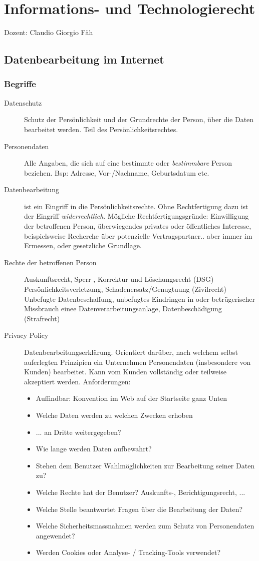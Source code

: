 \chapter{Informations- und Technologierecht}
Dozent: Claudio Giorgio Fäh

\section{Datenbearbeitung im Internet}
\subsection{Begriffe}
\begin{description}
  \item[Datenschutz] Schutz der Persönlichkeit und der Grundrechte der Person, über die Daten bearbeitet werden. Teil des Persönlichkeitsrechtes.
  \item[Personendaten] Alle Angaben, die sich auf eine bestimmte oder \textit{bestimmbare} Person beziehen. Bsp: Adresse, Vor-/Nachname, Geburtsdatum etc.  
  \item[Datenbearbeitung] ist ein Eingriff in die Persönlichkeitsrechte. Ohne Rechtfertigung dazu ist der Eingriff \textit{widerrechtlich}. Mögliche Rechtfertigungsgründe: Einwilligung der betroffenen Person, überwiegendes privates oder öffentliches Interesse, beispielsweise Recherche über potenzielle Vertragspartner.. aber immer im Ermessen, oder gesetzliche Grundlage.
  \item[Rechte der betroffenen Person] Auskunftsrecht, Sperr-, Korrektur und Löschungsrecht (DSG) Persönlichkeitsverletzung, Schadenersatz/Genugtuung (Zivilrecht) Unbefugte Datenbeschaffung, unbefugtes Eindringen in oder betrügerischer Missbrauch einee Datenverarbeitungsanlage, Datenbeschädigung (Strafrecht)
  \item[Privacy Policy] Datenbearbeitungserklärung. Orientiert darüber, nach welchem selbst auferlegten Prinzipien ein Unternehmen Personendaten (insbesondere von Kunden) bearbeitet. Kann vom Kunden vollständig oder teilweise akzeptiert werden. Anforderungen:
    \begin{itemize}
      \item Auffindbar: Konvention im Web auf der Startseite ganz Unten
      \item Welche Daten werden zu welchen Zwecken erhoben
      \item ... an Dritte weitergegeben?
      \item Wie lange werden Daten aufbewahrt?
      \item Stehen dem Benutzer Wahlmöglichkeiten zur Bearbeitung seiner Daten zu?
      \item Welche Rechte hat der Benutzer? Auskunfts-, Berichtigungsrecht, ...
      \item Welche Stelle beantwortet Fragen über die Bearbeitung der Daten?
      \item Welche Sicherheitsmassnahmen werden zum Schutz von Personendaten angewendet?
      \item Werden Cookies oder Analyse- / Tracking-Tools verwendet?
    \end{itemize}
\end{description}

